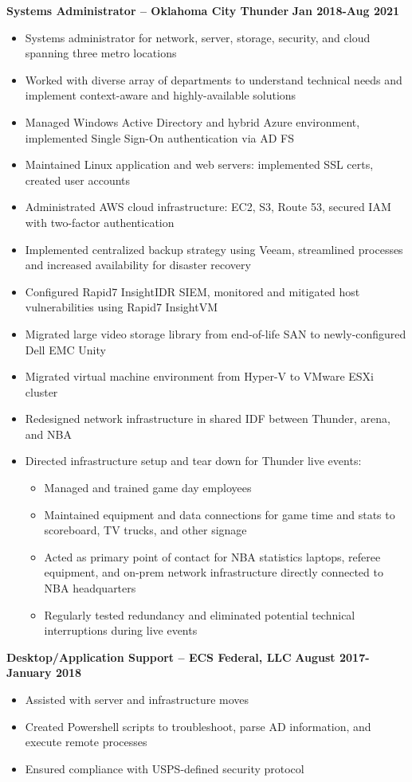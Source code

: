 \documentclass[line]{res}
\begin{document}
\begin{resume}
\textbf{Systems Administrator -- Oklahoma City Thunder}
\newline
\textbf{Jan 2018-Aug 2021}
\begin{itemize}
		\item Systems administrator for network, server, storage, security, and cloud spanning three metro locations
		\item Worked with diverse array of departments to understand technical needs and implement context-aware and highly-available solutions
		\item Managed Windows Active Directory and hybrid Azure environment, implemented Single Sign-On authentication via AD FS
		\item Maintained Linux application and web servers: implemented SSL certs, created user accounts
		\item Administrated AWS cloud infrastructure: EC2, S3, Route 53, secured IAM with two-factor authentication
		\item Implemented centralized backup strategy using Veeam, streamlined processes and increased availability for disaster recovery
		\item Configured Rapid7 InsightIDR SIEM, monitored and mitigated host vulnerabilities using Rapid7 InsightVM
		\item Migrated large video storage library from end-of-life SAN to newly-configured Dell EMC Unity
		\item Migrated virtual machine environment from Hyper-V to VMware ESXi cluster
		\item Redesigned network infrastructure in shared IDF between Thunder, arena, and NBA 
\item Directed infrastructure setup and tear down for Thunder live events:
	\begin{itemize}
		\item Managed and trained game day employees
		\item Maintained equipment and data connections for game time and stats to scoreboard, TV trucks, and other signage
		\item Acted as primary point of contact for NBA statistics laptops, referee equipment, and on-prem network infrastructure directly connected to NBA headquarters
		\item Regularly tested redundancy and eliminated potential technical interruptions during live events
	\end{itemize}
\end{itemize}
	
\textbf{Desktop/Application Support -- ECS Federal, LLC}
\newline
\textbf{August 2017-January 2018}
\begin{itemize}
    \item Assisted with server and infrastructure moves
    \item Created Powershell scripts to troubleshoot, parse AD information, and execute remote processes
    \item Ensured compliance with USPS-defined security protocol
\end{itemize}


\end{resume}
\end{document}
